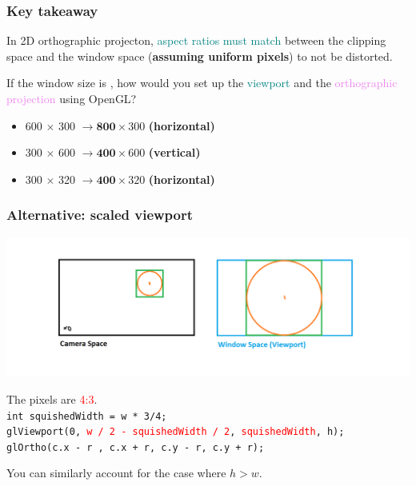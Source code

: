 \documentclass{beamer}
\begin{document}
\begin{frame}
    \frametitle{Key takeaway}

    In 2D orthographic projecton, \textcolor{teal}{aspect ratios must match} between 
    the clipping space and the window space (\textbf{assuming uniform pixels})
    to not be distorted.

    \begin{tcolorbox}
        If the window size is \underline{\quad\quad}, how would you set up the \textcolor{teal}{viewport} and the
        \textcolor{violet}{orthographic projection} using OpenGL?
        \begin{itemize}
            \item 600 $\times$ 300 $\rightarrow \textbf{800} \times 300$ \textbf{(horizontal)}
            \item 300 $\times$ 600 $\rightarrow \textbf{400} \times 600$ \textbf{(vertical)}
            \item 300 $\times$ 320 $\rightarrow \textbf{400} \times 320$ \textbf{(horizontal)}
        \end{itemize}
    \end{tcolorbox}

\end{frame}

\begin{frame}
    \frametitle{Alternative: scaled viewport}

    \begin{center}
        \includegraphics[scale=0.3]{q7-cam-win-4.png}
    \end{center}

    \begin{tcolorbox}
        \small
        The pixels are \textcolor{red}{4:3}.\\
        \texttt{int squishedWidth = w * 3/4;}\\
        \texttt{glViewport(0, \textcolor{red}{w / 2 - squishedWidth / 2}, \textcolor{red}{squishedWidth}, h);}\\
        \texttt{glOrtho(c.x - r , c.x + r, c.y - r, c.y + r);}
    \end{tcolorbox}

    You can similarly account for the case where $h > w$.

\end{frame}
\end{document}
